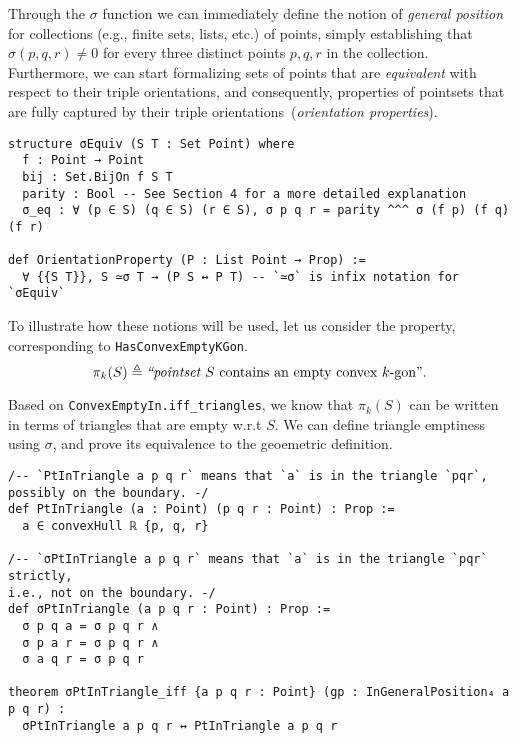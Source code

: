 Through the $\sigma$ function we can immediately define the notion of \emph{general position} for collections (e.g., finite sets, lists, etc.) of points, simply establishing that $\sigma(p, q, r) \neq 0$ for every three distinct points $p, q, r$ in the collection.
Furthermore, we can start formalizing sets of points that are \emph{equivalent} with respect to their triple orientations, and consequently, properties of pointsets that are fully captured by their triple orientations~(\emph{orientation properties}).
% 
\begin{lstlisting}
structure σEquiv (S T : Set Point) where
  f : Point → Point
  bij : Set.BijOn f S T
  parity : Bool -- See Section 4 for a more detailed explanation
  σ_eq : ∀ (p ∈ S) (q ∈ S) (r ∈ S), σ p q r = parity ^^^ σ (f p) (f q) (f r)

def OrientationProperty (P : List Point → Prop) :=
  ∀ {{S T}}, S ≃σ T → (P S ↔ P T) -- `≃σ` is infix notation for `σEquiv`
\end{lstlisting}

To illustrate how these notions will be used, let us consider the property, corresponding to \lstinline|HasConvexEmptyKGon|.
\[
  \pi_k(S) \triangleq \text{\em ``pointset } S \text{ contains an empty convex } k\text{-gon''}.
\]

Based on \lstinline|ConvexEmptyIn.iff_triangles|, we know that $\pi_k(S)$ can be written in terms of triangles that are empty w.r.t $S$. We can define triangle emptiness using $\sigma$, and prove its equivalence to the geoemetric definition.
\begin{lstlisting}
/-- `PtInTriangle a p q r` means that `a` is in the triangle `pqr`,
possibly on the boundary. -/
def PtInTriangle (a : Point) (p q r : Point) : Prop :=
  a ∈ convexHull ℝ {p, q, r}

/-- `σPtInTriangle a p q r` means that `a` is in the triangle `pqr` strictly,
i.e., not on the boundary. -/
def σPtInTriangle (a p q r : Point) : Prop :=
  σ p q a = σ p q r ∧
  σ p a r = σ p q r ∧
  σ a q r = σ p q r

theorem σPtInTriangle_iff {a p q r : Point} (gp : InGeneralPosition₄ a p q r) :
  σPtInTriangle a p q r ↔ PtInTriangle a p q r
\end{lstlisting}



